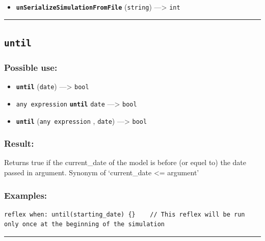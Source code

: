 \documentclass[]{book}
\providecommand{\tightlist}{%
  \setlength{\itemsep}{0pt}\setlength{\parskip}{0pt}}
\theoremstyle{definition}
\theoremstyle{definition}
\theoremstyle{definition}
\theoremstyle{remark}
\begin{document}
\begin{itemize}
\tightlist
\item
  \textbf{\texttt{unSerializeSimulationFromFile}} (\texttt{string})
  ---\textgreater{} \texttt{int}
\end{itemize}

\begin{center}\rule{0.5\linewidth}{\linethickness}\end{center}

\subsection{\texorpdfstring{\texttt{until}}{until}}\label{until}

\subsubsection{Possible use:}\label{possible-use-542}

\begin{itemize}
\tightlist
\item
  \textbf{\texttt{until}} (\texttt{date}) ---\textgreater{}
  \texttt{bool}
\item
  \texttt{any\ expression} \textbf{\texttt{until}} \texttt{date}
  ---\textgreater{} \texttt{bool}
\item
  \textbf{\texttt{until}} (\texttt{any\ expression} , \texttt{date})
  ---\textgreater{} \texttt{bool}
\end{itemize}

\subsubsection{Result:}\label{result-522}

Returns true if the current\_date of the model is before (or equel to)
the date passed in argument. Synonym of `current\_date \textless{}=
argument'

\subsubsection{Examples:}\label{examples-374}

\begin{verbatim}
reflex when: until(starting_date) {}    // This reflex will be run only once at the beginning of the simulation 
\end{verbatim}

\begin{center}\rule{0.5\linewidth}{\linethickness}\end{center}
\end{document}
